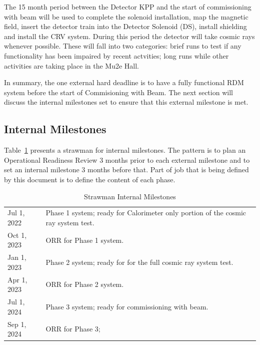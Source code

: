 The 15 month period between the Detector KPP and the start of commissioning with beam will be used
to complete the solenoid installation,
map the magnetic field,
insert the detector train into the Detector Solenoid (DS),
install shielding
and install the CRV system.
During this period the detector will take cosmic rays whenever possible.
These will fall into two categories:
brief runs to test if any functionality has been impaired by recent actvities;
long runs while other activities are taking place in the Mu2e Hall.

In summary, the one external hard deadline is to have a fully functional RDM system before the start of
Commisioning with Beam.
The next section will discuss the internal milestones set to ensure that this external milestone is met.

\subsection{Internal Milestones}
\label{ssec:InternalMilestones}

Table~\ref{tab:internalmilestones} presents a strawman for internal milestones.
The pattern is to plan an Operational Readiness Review 3 months prior to each external
milestone and to set an internal milestone 3 months before that.
Part of job that is being defined by this document is to define the content of each phase.


\begin{table}
\begin{center}
\caption[Strawman Interal Milestones]{Strawman Internal Milestones}
\label{tab:internalmilestones}
\begin{tabular}{ll}\hline
  Jul 1, 2022 & Phase 1 system; ready for Calorimeter only portion of the cosmic ray system test. \\
  Oct 1, 2023 & ORR for Phase 1 system. \\
  Jan 1, 2023 & Phase 2 system; ready for for the full cosmic ray system test. \\
  Apr 1, 2023 & ORR for Phase 2 system. \\
  Jul 1, 2024 & Phase 3 system; ready for commissioning with beam. \\
  Sep 1, 2024 & ORR for Phase 3; \\
   \hline
  \end{tabular}
\end{center}
\end{table}


